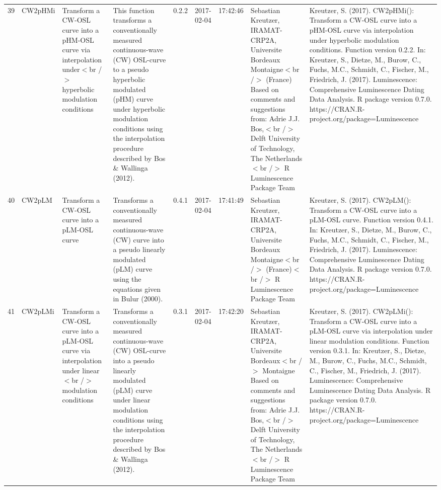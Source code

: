 \begin{table}[ht]
\begin{tabular}{rllllllll}
 \\ 
  39 & CW2pHMi & Transform a CW-OSL curve into a pHM-OSL curve via interpolation under$<$br /$>$ hyperbolic modulation conditions & This function transforms a conventionally measured continuous-wave (CW) OSL-curve to a pseudo hyperbolic modulated (pHM) curve under hyperbolic modulation conditions using the interpolation procedure described by Bos \& Wallinga (2012). & 0.2.2 & 2017-02-04 & 17:42:46
 & Sebastian Kreutzer, IRAMAT-CRP2A, Universite Bordeaux Montaigne$<$br /$>$ (France)   Based on comments and suggestions from:  Adrie J.J. Bos,$<$br /$>$ Delft University of Technology, The Netherlands $<$br /$>$  R Luminescence Package Team & Kreutzer, S. (2017). CW2pHMi(): Transform a CW-OSL curve into a pHM-OSL curve via interpolation under hyperbolic modulation conditions. Function version 0.2.2. In: Kreutzer, S., Dietze, M., Burow, C., Fuchs, M.C., Schmidt, C., Fischer, M., Friedrich, J. (2017). Luminescence: Comprehensive Luminescence Dating Data Analysis. R package version 0.7.0. https://CRAN.R-project.org/package=Luminescence
 \\ 
  40 & CW2pLM & Transform a CW-OSL curve into a pLM-OSL curve & Transforms a conventionally measured continuous-wave (CW) curve into a pseudo linearly modulated (pLM) curve using the equations given in Bulur (2000). & 0.4.1 & 2017-02-04 & 17:41:49
 & Sebastian Kreutzer, IRAMAT-CRP2A, Universite Bordeaux Montaigne$<$br /$>$ (France)$<$br /$>$  R Luminescence Package Team & Kreutzer, S. (2017). CW2pLM(): Transform a CW-OSL curve into a pLM-OSL curve. Function version 0.4.1. In: Kreutzer, S., Dietze, M., Burow, C., Fuchs, M.C., Schmidt, C., Fischer, M., Friedrich, J. (2017). Luminescence: Comprehensive Luminescence Dating Data Analysis. R package version 0.7.0. https://CRAN.R-project.org/package=Luminescence
 \\ 
  41 & CW2pLMi & Transform a CW-OSL curve into a pLM-OSL curve via interpolation under linear$<$br /$>$ modulation conditions & Transforms a conventionally measured continuous-wave (CW) OSL-curve into a pseudo linearly modulated (pLM) curve under linear modulation conditions using the interpolation procedure described by Bos \& Wallinga (2012). & 0.3.1 & 2017-02-04 & 17:42:20
 & Sebastian Kreutzer, IRAMAT-CRP2A, Universite Bordeaux$<$br /$>$ Montaigne  Based on comments and suggestions from:  Adrie J.J. Bos,$<$br /$>$ Delft University of Technology, The Netherlands $<$br /$>$  R Luminescence Package Team & Kreutzer, S. (2017). CW2pLMi(): Transform a CW-OSL curve into a pLM-OSL curve via interpolation under linear modulation conditions. Function version 0.3.1. In: Kreutzer, S., Dietze, M., Burow, C., Fuchs, M.C., Schmidt, C., Fischer, M., Friedrich, J. (2017). Luminescence: Comprehensive Luminescence Dating Data Analysis. R package version 0.7.0. https://CRAN.R-project.org/package=Luminescence

\end{tabular}
\end{table}
